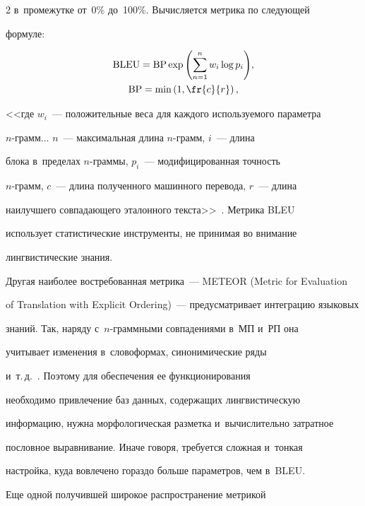 \begin{multicols}{2}
в~промежутке от~0\% до~100\%. Вычисляется метрика по следующей 


формуле:


  \begin{multline*}


  \mathrm{BLEU} =\mathrm{BP}\exp \left( \sum\limits^n_{n=1} w_i \log 


p_i\right) \!,\\


 \mathrm{BP} =\min\left( 1,\fr{c}{r}\right),


  \end{multline*}


  <<где $w_i$~--- положительные веса для каждого используемого параметра  


$n$-грамм$\ldots$ $n$~--- максимальная длина $n$-грамм, $i$~--- длина 


блока в~пределах $n$-грам\-мы, $p_i$~--- модифицированная точность  


$n$-грамм, $c$~--- длина полученного машинного перевода, $r$~--- длина 


наилучшего совпадающего эталонного текста>>~\cite[с.~86]{8-nur}. Мет\-ри\-ка BLEU 


использует статистические инструменты, не принимая во внимание 


лингвистические знания.


  


  Другая наиболее востребованная метрика~--- \mbox{METEOR} (Metric for Evaluation 


of Translation with Explicit Ordering)~--- предусмат\-ри\-ва\-ет интеграцию языковых 


знаний. Так, наряду с~$n$-грам\-мны\-ми совпадениями в~МП и~РП она 


учитывает изменения в~словоформах, синонимические ряды  


и~т.\,д.~\cite{9-nur}. Поэтому для обеспечения ее функционирования 


необходимо привлечение баз данных, содержащих лингвистическую 


информацию, нужна морфологическая разметка и~вычислительно затратное 


пословное выравнивание. Иначе говоря, требуется сложная и~тонкая 


настройка, куда вовлечено гораздо больше параметров, чем в~BLEU.


  


  Еще одной получившей широкое распространение метрикой 



\end{multicols}
